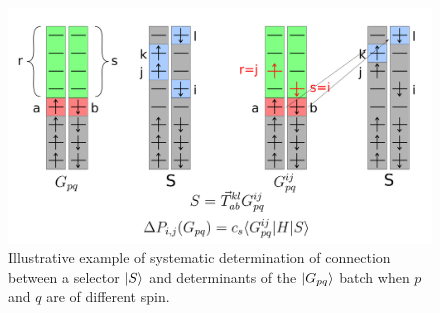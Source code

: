 \documentclass[./thesis.tex]{subfiles}
\begin{document}
\begin{figure}[h!]
        \begin{center}
                \includegraphics[width=0.90\columnwidth]{figures/cipsi/systematic_determination2}       
                \caption{Illustrative example of systematic determination of connection between a selector $\ket S$ and determinants of the $\ket {G_{pq}}$ batch when $p$ and $q$ are of different spin.
}
                \label{fig:systematic_determination2}
        \end{center}
\end{figure}
\end{document}
